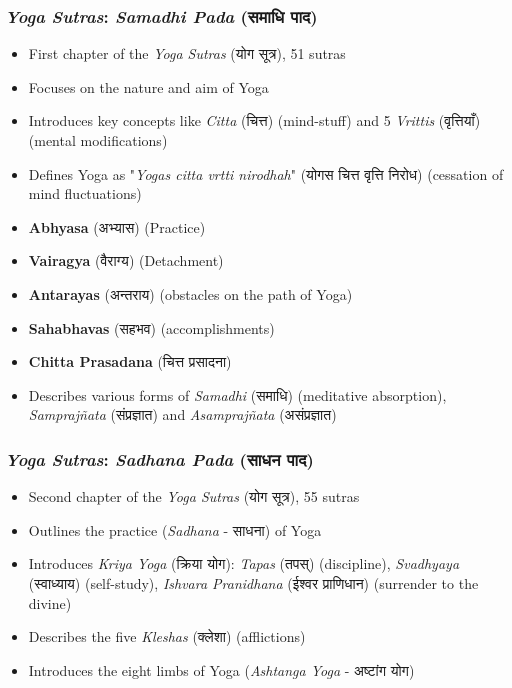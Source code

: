 \begin{frame}[fragile]\frametitle{\textit{Yoga Sutras}: \textit{Samadhi Pada} (समाधि पाद)}

    \begin{itemize}
        \item First chapter of the \textit{Yoga Sutras} (योग सूत्र), 51 sutras
        \item Focuses on the nature and aim of Yoga
        \item Introduces key concepts like \textit{Citta} (चित्त) (mind-stuff) and 5 \textit{Vrittis} (वृत्तियाँ) (mental modifications)
        \item Defines Yoga as "\textit{Yogas citta vrtti nirodhah}" (योगस चित्त वृत्ति निरोध) (cessation of mind fluctuations)
        \item \textbf{Abhyasa} (अभ्यास) (Practice)
        \item \textbf{Vairagya} (वैराग्य) (Detachment)
        \item \textbf{Antarayas} (अन्तराय) (obstacles on the path of Yoga)
        \item \textbf{Sahabhavas} (सहभव) (accomplishments)
        \item \textbf{Chitta Prasadana} (चित्त प्रसादना)
        \item Describes various forms of \textit{Samadhi} (समाधि) (meditative absorption), \textit{Samprajñata} (संप्रज्ञात) and \textit{Asamprajñata} (असंप्रज्ञात)
    \end{itemize}

\end{frame}

\begin{frame}[fragile]\frametitle{\textit{Yoga Sutras}: \textit{Sadhana Pada} (साधन पाद)}

    \begin{itemize}
        \item Second chapter of the \textit{Yoga Sutras} (योग सूत्र), 55 sutras
        \item Outlines the practice (\textit{Sadhana} - साधना) of Yoga
        \item Introduces \textit{Kriya Yoga} (क्रिया योग): \textit{Tapas} (तपस्) (discipline), \textit{Svadhyaya} (स्वाध्याय) (self-study), \textit{Ishvara Pranidhana} (ईश्वर प्राणिधान) (surrender to the divine)
        \item Describes the five \textit{Kleshas} (क्लेशा) (afflictions)
        \item Introduces the eight limbs of Yoga (\textit{Ashtanga Yoga} - अष्टांग योग)
    \end{itemize}

\end{frame}

